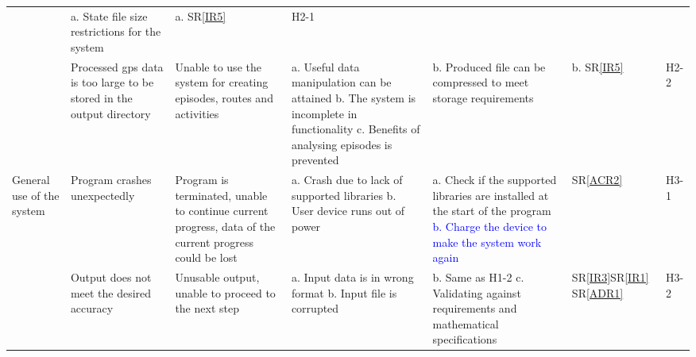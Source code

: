 \documentclass{article}
\begin{document}
\begin{landscape}
\begin{table}[H]
{\begin{tabular}{|p{1.8 in}|p{2.0 in}|p{2 in}|p{2 in}|p{2.3 in}|p{0.5 in}|p{0.5 in}|}
& a. State file size restrictions for the system \newline
& a. SR\ref{IR5} \newline 
& H2-1\\



& Processed gps data is too large to be stored in the output directory
& Unable to use the system for creating episodes, routes and activities
& a. Useful data manipulation can be attained\newline
  b. The system is incomplete in functionality\newline
  c. Benefits of analysing episodes is prevented \newline 
& b. Produced file can be compressed to meet storage requirements\newline
& b. SR\ref{IR5} \newline 
& H2-2 \\ \hline
 


\multirow{3}{1.8in}{General use of the system} 
& Program crashes unexpectedly
& Program is terminated, unable to continue current progress, data of the
current progress could be lost
& 
a. Crash due to lack of supported libraries\newline
b. User device runs out of power\newline
& 
a. Check if the supported libraries are installed at the start of the program
\textcolor{blue}{b. Charge the device to make the system work again\newline}
& SR\ref{ACR2}%
& H3-1\label{H3-1} \\


& Output does not meet the desired accuracy
& Unusable output, unable to proceed to the next step
&
a. Input data is in wrong format
b. Input file is corrupted
& 
b. Same as H1-2 \newline
c. Validating against requirements and mathematical specifications\newline
& SR\ref{IR3}\newline SR\ref{IR1} \newline SR\ref{ADR1}
& H3-2\label{H3-2}  \\





\end{tabular}}
\end{table}
\end{landscape}
\end{document}
